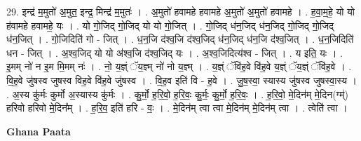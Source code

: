 \documentclass[17pt]{extarticle}
\begin{document}
29. इन्द्र॑ म॒मुतो॑ अ॒मुत॒ इन्द्र॒ मिन्द्र॑ म॒मुतः॑ । . अ॒मुतो॑ हवामहे हवामहे अ॒मुतो॑ अ॒मुतो॑ हवामहे । . ह॒वा॒म॒हे॒ यो यो ह॑वामहे हवामहे॒ यः । . यो गो॒जिद् गो॒जिद् यो यो गो॒जित् । . गो॒जिद् ध॑न॒जिद् ध॑न॒जिद् गो॒जिद् गो॒जिद् ध॑न॒जित् । . गो॒जिदिति॑ गो - जित् । . ध॒न॒जि द॑श्व॒जि द॑श्व॒जिद् ध॑न॒जिद् ध॑न॒जि द॑श्व॒जित् । . ध॒न॒जिदिति॑ धन - जित् । . अ॒श्व॒जिद् यो यो अ॑श्व॒जि द॑श्व॒जिद् यः । . अ॒श्व॒जिदित्य॑श्व - जित् । . य इति॒ यः । . इ॒मम् नो॑ न इ॒म मि॒मम् नः॑ । . नो॒ य॒ज्ञ्ं ॅय॒ज्ञ्म् नो॑ नो य॒ज्ञ्म् । . य॒ज्ञ्ं ॅवि॑ह॒वे वि॑ह॒वे य॒ज्ञ्ं ॅय॒ज्ञ्ं ॅवि॑ह॒वे । . वि॒ह॒वे जु॑षस्व जुषस्व विह॒वे वि॑ह॒वे जु॑षस्व । . वि॒ह॒व इति॑ वि - ह॒वे । . जु॒ष॒स्वा॒ स्यास्य जु॑षस्व जुषस्वा॒स्य । . अ॒स्य कु॑र्मः कुर्मो अ॒स्यास्य कु॑र्मः । . कु॒र्मो॒ ह॒रि॒वो॒ ह॒रि॒वः॒ कु॒र्मः॒ कु॒र्मो॒ ह॒रि॒वः॒ । . ह॒रि॒वो॒ मे॒दिन॑म् मे॒दिन(ग्म्॑) हरिवो हरिवो मे॒दिन᳚म् । . ह॒रि॒व॒ इति॑ हरि - वः॒ । . मे॒दिन॑म् त्वा त्वा मे॒दिन॑म् मे॒दिन॑म् त्वा । . त्वेति॑ त्वा । \newline

\textbf{Ghana Paata } \newline
\end{document}
